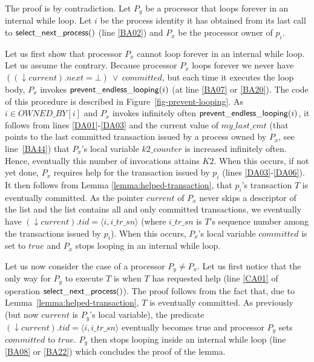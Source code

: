 \begin{proofL} 
The proof is by contradiction.
Let $P_y$ be a processor that loops  forever in an internal while loop. 
Let $i$ be the process identity it has obtained from its last call to 
${\sf select\_next\_process}()$ (line  \ref{BA02}) and $P_x$  be
the processor owner of $p_i$. 

Let us first show that  processor $P_x$ cannot loop forever in an internal
 while loop. Let us assume the contrary. 
Because processor $P_x$ loops forever we never have $((\downarrow current).next=\bot)~\vee~
\mathit{committed}$, but each time it executes the loop body, 
$P_x$ invokes ${\sf prevent\_endless\_looping}(i)$ (at line \ref{BA07} 
or \ref{BA20}). The code of this procedure is described in 
Figure~\ref{fig-prevent-looping}.  
As $i \in \mathit{OWNED\_BY}[i]$ and $P_x$ invokes infinitely often 
${\sf prevent\_endless\_looping}(i)$, it follows from lines 
\ref{DA01}-\ref{DA03}  and the current value of  $my\_last\_cmt$ (that 
points  to the last committed transaction issued by a process owned by 
$P_x$, see line~\ref{BA44}) that 
$P_x$'s local variable $k2\_counter$ is increased infinitely often.
Hence, eventually this number of invocations attains $K2$. 
When this  occurs, if not yet done, $P_x$ requires help  for the 
transaction issued by $p_i$ (lines \ref{DA03}-\ref{DA06}). 
It then follows from  Lemma \ref{lemma:helped-transaction},  
that $p_i$'s  transaction $T$  is  eventually  committed. As the  pointer
$current$ of $P_x$ never skips a descriptor of the list
and the list contains all and only committed transactions, 
we eventually have $(\downarrow current).tid = \langle i,i\_tr\_sn \rangle$
(where $i\_tr\_sn$  is $T$'s sequence number among the transactions issued
by $p_i$). When this occurs,  $P_x$'s local variable  $\mathit{committed}$ 
is set to $\mathit{true}$ and $P_x$ stops looping in an internal while loop. 


Let us now consider the case of a processor  $P_y \neq P_x$. 
Let us first notice that the only way for $P_y$ to execute $T$ is when 
$T$   has   requested   help    (line   \ref{CA01}   of   operation   ${\sf
select\_next\_process}()$). 
The proof follows from the fact that, due to
 Lemma~\ref{lemma:helped-transaction}, $T$ is eventually committed. 
As previously (but now  $current$ is  $P_y$'s local variable),
the predicate  $(\downarrow current).tid = \langle i,i\_tr\_sn \rangle$ 
eventually becomes true and processor $P_y$ sets  $\mathit{committed}$ 
 to $\mathit{true}$. $P_y$ then stops looping inside an internal while 
loop (line \ref{BA08} or \ref{BA22})  which concludes the proof of the lemma.
\renewcommand{\toto}{lemma:no-infinite-loop}
\end{proofL}

